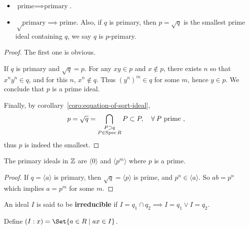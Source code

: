 \begin{prop} \hfill
  \begin{itemize}
    \item $\text{prime} \implies \text{primary}$.
    \item $\sqrt\text{primary} \implies \text{prime}$. Also, if $q$ is primary, then $p = \sqrt{q}$
      is the smallest prime ideal containing $q$, we say $q$ is $p$-primary.
  \end{itemize}

  \begin{proof}
    The first one is obvious.

    If $q$ is primary and $\sqrt{q} = p$. For any $xy \in p$ and $x \notin p$,
    there exists $n$ so that $x^n y^n \in q$, and for this $n$, $x^n \notin q$.
    Thus $(y^n)^m \in q$ for some $m$, hence $y \in p$. We conclude that $p$ is a prime ideal.

    Finally, by corollary~\ref{coro:equation-of-sqrt-ideal},
    \[ p = \sqrt{q} = \bigcap_{\substack{P \supset q \\ P \in \Spec R}} P \subset P,
    \quad \forall P \text{ prime }, \]
    thus $p$ is indeed the smallest.
  \end{proof}
\end{prop}

\begin{example}
  The primary ideals in $\mathbb{Z}$ are $\langle 0 \rangle$ and $\langle p^m \rangle$
  where $p$ is a prime.

  \begin{proof}
    If $q = \langle a \rangle$ is primary, then $\sqrt{q} = \langle p \rangle$ is
    prime, and $p^n \in \langle a \rangle$. So $ab = p^n$ which implies $a = p^m$
    for some $m$.
  \end{proof}
\end{example}

\begin{definition}
  An ideal $I$ is said to be {\bf irreducible} 
  if $I = q_1 \cap q_2 \implies I = q_1 \lor I = q_2$.
\end{definition}

\begin{definition}
  Define $(I: x) = \Set{ a \in R \mid ax \in I}$.
\end{definition}

